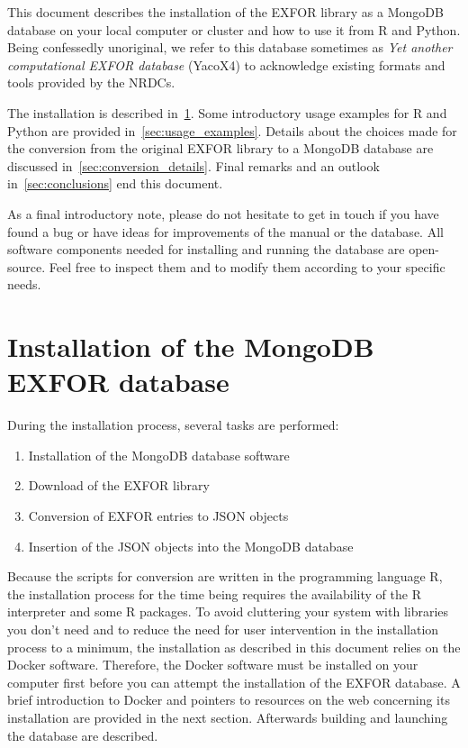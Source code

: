 \documentclass[12pt,a4paper]{scrartcl}
\begin{document}
  This document describes the installation of the EXFOR library as a MongoDB database on your local computer or cluster and how to use it from R and Python.
  Being confessedly unoriginal, we refer to this database sometimes as \textit{Yet another computational EXFOR database} (YacoX4) to acknowledge existing formats and tools provided by the NRDCs.  
  
  The installation is described in~\cref{sec:install_EXFOR}.
  Some introductory usage examples for R and Python are provided in~\cref{sec:usage_examples}.
 Details about the choices made for the conversion from the original EXFOR library to a MongoDB database are discussed in~\cref{sec:conversion_details}.
 Final remarks and an outlook in~\cref{sec:conclusions} end this document.
 
As a final introductory note, please do not hesitate to get in touch if you have found a bug or have ideas for improvements of the manual or the database.
All software components needed for installing and running the database are open-source.
Feel free to inspect them and to modify them according to your specific needs.

 \section{Installation of the MongoDB EXFOR database}
 \label{sec:install_EXFOR}

 During the installation process, several tasks are performed:
\begin{enumerate}
 \item Installation of the MongoDB database software
 \item Download of the EXFOR library
 \item Conversion of EXFOR entries to JSON objects
 \item Insertion of the JSON objects into the MongoDB database 
\end{enumerate}
Because the scripts for conversion are written in the programming language R, the installation process for the time being requires the availability of the R interpreter and some R packages.
To avoid cluttering your system with libraries you don't need and to reduce the need for user intervention in the installation process to a minimum, the installation as described in this document relies on the Docker software.
Therefore, the Docker software must be installed on your computer first before you can attempt the installation of the EXFOR database.
A brief introduction to Docker and pointers to resources on the web concerning its installation are provided in the next section.
Afterwards building and launching the database are described.
\end{document}
